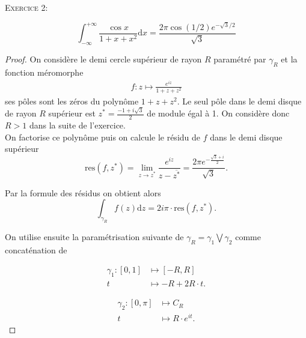 \documentclass[12pt]{article}
\newenvironment{statement}[1]
{\begin{mdframed}[linewidth=0.6pt]
        \textsc{Exercice #1:}

}
    {\end{mdframed}}
\newcommand{\de}{\mathrm{d}}
\begin{document}
 \newpage

\begin{statement}{2}
       \begin{equation*}
               \int_{-\infty}^{+\infty}\frac{\cos x}{1+x+x^{2}}\de x = \frac{2\pi\cos(1/2)e^{-\sqrt{3}/2}}{\sqrt{3}}
       \end{equation*} 
\end{statement}
\begin{proof}
        On considère le demi cercle supérieur de rayon $R$ paramétré par $\gamma_R$ et la fonction méromorphe 
        \begin{align*}
                f : z \longmapsto \frac{e^{iz}}{1+z+z^2}
        \end{align*}
        ses pôles sont les zéros du polynôme $1 + z + z^2$. Le seul pôle dans le demi disque de rayon $R$ supérieur est $z^{*} = \frac{-1+i\sqrt{3}}{2}$ de module égal à 1. On considère donc $R > 1$ dans la suite de l'exercice. \\

        On factorise ce polynôme puis on calcule le résidu de $f$ dans le demi disque supérieur \[
                \mathrm{res}(f, z^{*}) = \lim_{z \to z^{*}}\frac{e^{iz}}{z - \overline{z^{*}}} = \frac{2\pi e^{-\frac{\sqrt{3} +i}{2}}}{\sqrt{3}}
        .\] 

        Par la formule des résidus on obtient alors \[
                \int_{\gamma_R}f(z)\de z = 2i\pi \cdot \mathrm{res}(f, z^{*})
        .\] 

        On utilise ensuite la paramétrisation suivante de $\gamma_{R} = \gamma_{1} \bigvee \gamma_{2}$ comme concaténation de

        \begin{minipage}{0.5\textwidth}
             \begin{align*}
                     \gamma_1 : [0, 1] &\longmapsto [-R, R] \\
                     t &\longmapsto -R + 2R\cdot t
             .\end{align*}   
        \end{minipage}
        \hfill
        \begin{minipage}{0.5\textwidth}
                \begin{align*}
                        \gamma_2 : [0, \pi] &\longmapsto C_{R} \\ 
                        t &\longmapsto R\cdot e^{it} 
                .\end{align*}
        \end{minipage}


\end{proof}
\end{document}

